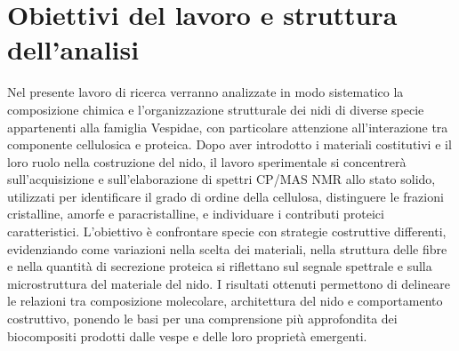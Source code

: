 \section{Obiettivi del lavoro e struttura dell’analisi}

Nel presente lavoro di ricerca verranno analizzate in modo sistematico la composizione chimica e l’organizzazione strutturale dei nidi di diverse specie appartenenti alla famiglia Vespidae, con particolare attenzione all’interazione tra componente cellulosica e proteica. 
Dopo aver introdotto i materiali costitutivi e il loro ruolo nella costruzione del nido, il lavoro sperimentale si concentrerà sull’acquisizione e sull’elaborazione di spettri  CP/MAS NMR allo stato solido, utilizzati per identificare il grado di ordine della cellulosa, distinguere le frazioni cristalline, amorfe e paracristalline, e individuare i contributi proteici caratteristici. 
L’obiettivo è confrontare specie con strategie costruttive differenti, evidenziando come variazioni nella scelta dei materiali, nella struttura delle fibre e nella quantità di secrezione proteica si riflettano sul segnale spettrale e sulla microstruttura del materiale del nido. 
I risultati ottenuti permettono di delineare le relazioni tra composizione molecolare, architettura del nido e comportamento costruttivo, ponendo le basi per una comprensione più approfondita dei biocompositi prodotti dalle vespe e delle loro proprietà emergenti.



